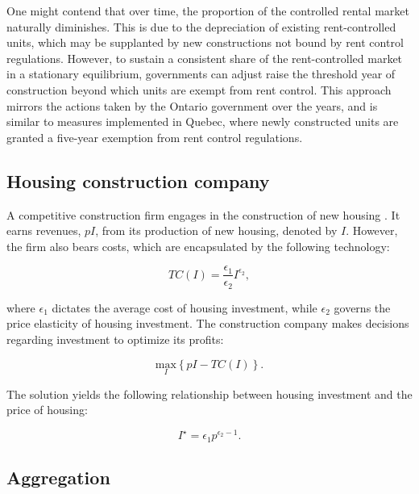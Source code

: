 \documentclass[parskip=full]{article}
\begin{document}
One might contend that over time, the proportion of the controlled rental market naturally diminishes. This is due to the depreciation of existing rent-controlled units, which may be supplanted by new constructions not bound by rent control regulations. However, to sustain a consistent share of the rent-controlled market in a stationary equilibrium, governments can adjust raise the threshold year of construction beyond which units are exempt from rent control. This approach mirrors the actions taken by the Ontario government over the years, and is similar to measures implemented in Quebec, where newly constructed units are granted a five-year exemption from rent control regulations.

\subsection{Housing construction company}\label{sec:construction_company}

A competitive construction firm engages in the construction of new housing \citep{rotberg-2022}. It earns revenues, $pI$, from its production of new housing, denoted by $I$. However, the firm also bears costs, which are encapsulated by the following technology:

\begin{equation*}
TC(I)=\frac{\epsilon_{1}}{\epsilon_{2}}I^{\epsilon_{2}}\label{eq:total_cost_structure},
\end{equation*}

\noindent where $\epsilon_{1}$ dictates the average cost of housing investment, while $\epsilon_{2}$ governs the price elasticity of housing investment. The construction company makes decisions regarding investment to optimize its profits:

\begin{equation*}
\label{eq:construction_company_profits}
\underset{I} {\text{$\mbox{max}$}}{\left\{p I-TC(I)\right\}}.
\end{equation*}

\noindent The solution yields the following relationship between housing investment and the price of housing:

\begin{equation}
\label{eq:construction_company_first_order_condition}
I^{\star}=\epsilon_{1} p^{\epsilon_{2}-1}.
\end{equation}

\subsection{Aggregation}\label{subsection:aggregation}
\end{document}
